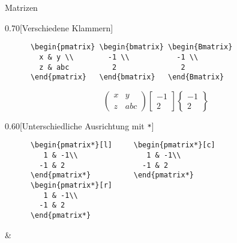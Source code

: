 \begin{frame}[fragile]{
  Matrizen
  \hfill{}
}
  \fontsize{8}{6}
  \begin{CodeExample}{0.70}[Verschiedene Klammern]
    \begin{lstlisting}
      \begin{pmatrix} \begin{bmatrix} \begin{Bmatrix}
        x & y \\        -1 \\           -1 \\
        z & abc          2               2
      \end{pmatrix}   \end{bmatrix}   \end{Bmatrix}
    \end{lstlisting}
  \CodeResult
    \removedisplayskip
    \begin{equation*}
      \begin{pmatrix}
        x & y \\
        z & abc
      \end{pmatrix}
      \begin{bmatrix}
        -1 \\
         2
      \end{bmatrix}
      \begin{Bmatrix}
        -1 \\
         2
      \end{Bmatrix}
    \end{equation*}
  \end{CodeExample}
  \begin{CodeExample}{0.60}[Unterschiedliche Ausrichtung mit \lstinline+*+]
    \begin{lstlisting}
      \begin{pmatrix*}[l]     \begin{pmatrix*}[c]
         1 & -1\\                1 & -1\\
        -1 & 2                  -1 & 2 
      \end{pmatrix*}          \end{pmatrix*}     
      \begin{pmatrix*}[r]    
         1 & -1\\
        -1 & 2 
      \end{pmatrix*}
    \end{lstlisting}
  \CodeResult
    \removedisplayskip
    \begin{flalign*}
      &\begin{pmatrix*}[l]

\end{pmatrix*}
\end{flalign*}
\end{CodeExample}
\end{frame}

